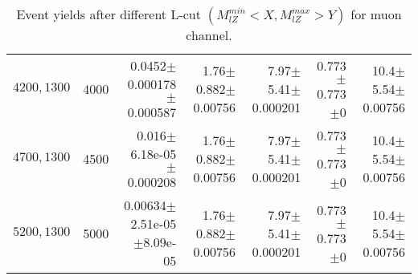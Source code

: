 \documentclass[]{article}
\begin{document}
\begin{table}
\begin{center}
{\begin{tabular}{ |r|r|r|r|r|r|r|}
$4200,1300$ & 4000 & 0.0452$\pm$0.000178$\pm$0.000587 & 1.76$\pm$0.882$\pm$0.00756 & 7.97$\pm$5.41$\pm$0.000201 & 0.773$\pm$0.773$\pm$0 & 10.4$\pm$5.54$\pm$0.00756 \\
$4700,1300$ & 4500 & 0.016$\pm$6.18e-05$\pm$0.000208 & 1.76$\pm$0.882$\pm$0.00756 & 7.97$\pm$5.41$\pm$0.000201 & 0.773$\pm$0.773$\pm$0 & 10.4$\pm$5.54$\pm$0.00756 \\
$5200,1300$ & 5000 & 0.00634$\pm$2.51e-05$\pm$8.09e-05 & 1.76$\pm$0.882$\pm$0.00756 & 7.97$\pm$5.41$\pm$0.000201 & 0.773$\pm$0.773$\pm$0 & 10.4$\pm$5.54$\pm$0.00756 \\
\hline 
\end{tabular}
}
\end{center}
\caption{Event yields after different L-cut $(M_{lZ}^{min} < X, M_{lZ}^{max} > Y)$ for muon channel.}
\end{table}
\end{document}
